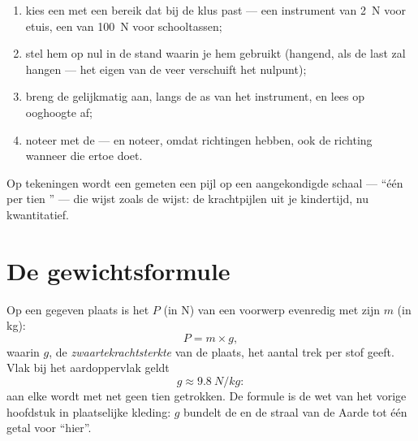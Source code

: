 \begin{method}\label{met:g9:weight-vs-mass:measure}
\begin{enumerate}
  \item kies een  met een bereik dat bij de klus past
        --- een instrument van \qty{2}{N} voor etuis, een van
        \qty{100}{N} voor schooltassen;
  \item stel hem op nul in de stand waarin je hem gebruikt (hangend,
        als de last zal hangen --- het eigen  van de veer
        verschuift het nulpunt);
  \item breng de  gelijkmatig aan, langs de as van het
        instrument, en lees op ooghoogte af;
  \item noteer met de  --- en noteer, omdat
         richtingen hebben, ook de richting wanneer die
        ertoe doet.
\end{enumerate}
Op tekeningen wordt een gemeten  een pijl op een
aangekondigde schaal --- ``één  per tien
'' --- die wijst zoals de  wijst: de
krachtpijlen uit je kindertijd, nu kwantitatief.
\end{method}

\section{De gewichtsformule}

\begin{proposition}\label{prop:g9:weight-vs-mass:formula}
Op een gegeven plaats is het  $P$ (in \unit{N}) van een
voorwerp evenredig met zijn  $m$ (in \unit{kg}):
\[
P = m \times g ,
\]
waarin $g$, de \emph{zwaartekrachtsterkte}
van de plaats, het aantal  trek per
 stof geeft. Vlak bij het aardoppervlak geldt
\[
g \approx \qty{9.8}{N/kg}:
\]
aan elke  wordt met net geen tien
 getrokken. De formule is de wet van het vorige
hoofdstuk in plaatselijke kleding: $g$ bundelt de  en de
straal van de Aarde tot één getal voor ``hier''.
\end{proposition}

